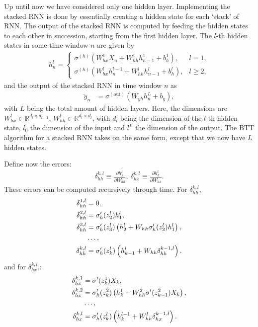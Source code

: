 \documentclass[%
reprint,
amsmath,amssymb,
aps,
]{revtex4-2}
\begin{document}
Up until now we have considered only one hidden layer. Implementing the stacked RNN is done by essentially creating a hidden state for each `stack' of RNN. The output of the stacked RNN is computed by feeding the hidden states to each other in succession, starting from the first hidden layer. The \(l\)-th hidden states in some time window \(n\) are given by
\begin{align}
	h^{l}_{n} = \begin{cases}
		\sigma^{(h)}\left( W_{hx}^{1}X_{n} + W_{hh}^{1}h_{n-1}^{1} + b_{h}^{1}\right), &l=1, \\
		\sigma^{(h)}\left( W_{hx}^{l}h_{n}^{l-1} + W_{hh}^{l}h_{n-1}^{l} + b_{h}^{l}\right), &l\geq 2,
	\end{cases}
\end{align}	
and the output of the stacked RNN in time window \(n\) as
\begin{align}
	\tilde{y}_{n} &= \sigma^{(\text{out})}\left( W_{yh}h^{L}_{n} + b_{y} \right),
\end{align}
with \(L\) being the total amount of hidden layers. 
Here, the dimensions are \(W^{l}_{hx}\in\mathbb{R}^{d_{l}\times d_{l-1}}\), \(W^{l}_{hh}\in\mathbb{R}^{d_{l}\times d_{l}}\), with \(d_l\) being the dimension of the \(l\)-th hidden state, \(l_0\) the dimension of the input and \(l^{L}\) the dimension of the output. The BTT algorithm for a stacked RNN takes on the same form, except that we now have \(L\) hidden states. 


Define now the errors:
\begin{align}
	\delta^{k,l}_{hh}\equiv \frac{\partial h_{k}^{l}}{\partial W_{hh}^{l}}, \ \delta^{k,l}_{hx}\equiv \frac{\partial h_{k}^{l}}{\partial W_{hx}^{l}}.
\end{align}
These errors can be computed recursively through time. For \(\delta^{k,l}_{hh}\), 
\begin{align}
	\delta^{1,l}_{hh} &= 0, \notag\\
	\delta^{2,l}_{hh} &= \sigma'_{h}(z_2^{l}) h_1^{l},  \notag\\
	\delta^{3,l}_{hh} &= \sigma'_{h}(z_3^{l}) \left( h_2^{l} + W_{hh}\sigma'_{h}(z_2^{l})h_1^{l} \right), \\
	&\dots, \notag \\
	\delta^{k,l}_{hh} &= \sigma'_{h}(z_{k}^{l}) \left( h_{k-1}^{l} + W_{hh}\delta^{k-1,l}_{hh}\right).
\end{align}
and for \(\delta^{k,l}_{hx}\),:
\begin{align}
	\delta^{k,1}_{hx} &= \sigma'(z_{k}^{1})X_{k}, \notag\\
	\delta^{k,2}_{hx} &= \sigma'_{h}(z_{k}^{2}) \left( h_{k}^{1} + W^{2}_{hh}\sigma'(z_{k-1}^{2})X_{k} \right),  \notag\\
	&\dots, \notag \\
	\delta^{k,l}_{hx} &= \sigma'_{h}(z_{k}^{l}) \left( h_{k}^{l-1} + W_{hh}^{l}\delta^{k-1,l}_{hx}\right).
\end{align}
\end{document}

